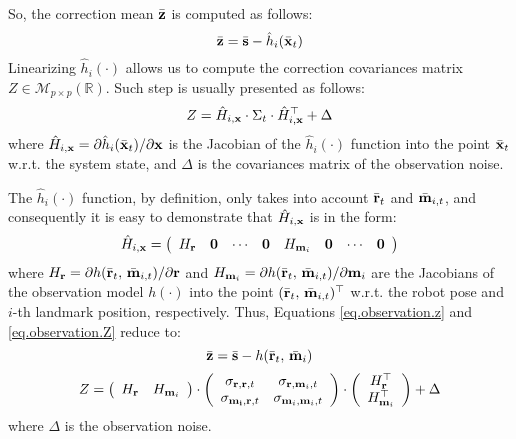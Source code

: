 	So, the correction mean $\bar{\boldsymbol{\mathrm{{z}}}}$ is computed as follows:
	\begin{equation}
		\label{eq.observation.z}
		\bvect{z} = \bvect{s} - \hat{h}_i(\bvect{x}_t) %
	\end{equation}
	Linearizing $\hat{h}_i(\cdot)$ allows us to compute the correction covariances matrix $Z \in \mathcal{M}_{p \times p}(\mathbb{R})$. Such step is usually presented as follows:
	\begin{equation}
		\label{eq.observation.Z}
		Z = \hat{H}_{i,\boldsymbol{\mathrm{{x}}}} \cdot \Sigma_t \cdot \hat{H}^\top_{i,\boldsymbol{\mathrm{{x}}}} + \Delta
	\end{equation}
	where $\hat{H}_{i,\boldsymbol{\mathrm{{x}}}} = \partial \hat{h}_i(\bar{\boldsymbol{\mathrm{{x}}}}_{t}) / \partial \boldsymbol{\mathrm{{x}}}$ is the Jacobian of the $\hat{h}_i(\cdot)$ function into the point $\bar{\boldsymbol{\mathrm{{x}}}}_{t}$ w.r.t. the system state, and $\Delta$ is the covariances matrix of the observation noise.
	
	The $\hat{h}_i(\cdot)$ function, by definition, only takes into account $\bar{\boldsymbol{\mathrm{{r}}}}_t$ and $\bar{\boldsymbol{\mathrm{{m}}}}_{i,t}$, and consequently it is easy to demonstrate that $\hat{H}_{i,\boldsymbol{\mathrm{{x}}}}$ is in the form:
	\begin{equation}
		\label{eq.observation.sparse_jacobian}
		\hat{H}_{i,\boldsymbol{\mathrm{{x}}}} = 
		\left(\begin{array}{cccccccc}
			H_{\boldsymbol{\mathrm{{r}}}} & \boldsymbol{\mathrm{{0}}} & \cdots & \boldsymbol{\mathrm{{0}}} & H_{\boldsymbol{\mathrm{{m}}}_i} & \boldsymbol{\mathrm{{0}}} & \cdots & \boldsymbol{\mathrm{{0}}}
		\end{array}\right)
	\end{equation}
	where $H_{\boldsymbol{\mathrm{{r}}}} = \partial h(\bar{\boldsymbol{\mathrm{{r}}}}_{t},\, \bar{\boldsymbol{\mathrm{{m}}}}_{i,t}) / \partial \boldsymbol{\mathrm{{r}}}$ and $H_{\boldsymbol{\mathrm{{m}}}_i} = \partial h(\bar{\boldsymbol{\mathrm{{r}}}}_{t},\, \bar{\boldsymbol{\mathrm{{m}}}}_{i,t}) / \partial \boldsymbol{\mathrm{{m}}}_i$ are the Jacobians of the observation model $h(\cdot)$ into the point $(\bar{\boldsymbol{\mathrm{{r}}}}_{t},\, \bar{\boldsymbol{\mathrm{{m}}}}_{i,t})^\top$ w.r.t. the robot pose and $i$-th landmark position, respectively.
	Thus, Equations \ref{eq.observation.z} and \ref{eq.observation.Z} reduce to:
	\begin{equation}
		\label{eq.observation.mean}
		\bar{\boldsymbol{\mathrm{{z}}}} = \bar{\boldsymbol{\mathrm{{s}}}} - h(\bar{\boldsymbol{\mathrm{{r}}}}_t,\, \bar{\boldsymbol{\mathrm{{m}}}}_i)
	\end{equation}
	\begin{equation}
		\label{eq.observation.covs}
		Z = 
		\left(\begin{array}{cc}
			H_{\boldsymbol{\mathrm{{r}}}} & H_{\boldsymbol{\mathrm{{m}}}_i}
		\end{array}\right)
		\cdot
		\left(\begin{array}{cc}
			\sigma_{\boldsymbol{\mathrm{{r}}}, \boldsymbol{\mathrm{{r}}}, t} & \sigma_{\boldsymbol{\mathrm{{r}}}, \boldsymbol{\mathrm{{m}}}_i, t} \\
			\sigma_{\boldsymbol{\mathrm{{m_i}}}, \boldsymbol{\mathrm{{r}}}, t} & \sigma_{\boldsymbol{\mathrm{{m}}}_i, \boldsymbol{\mathrm{{m}}}_i, t}
		\end{array}\right)
		\cdot
		\left(\begin{array}{c}
			H^\top_{\boldsymbol{\mathrm{{r}}}} \\ H^\top_{\boldsymbol{\mathrm{{m}}}_i}
		\end{array}\right)
		+ \Delta
	\end{equation}
	where $\Delta$ is the observation noise.
	
